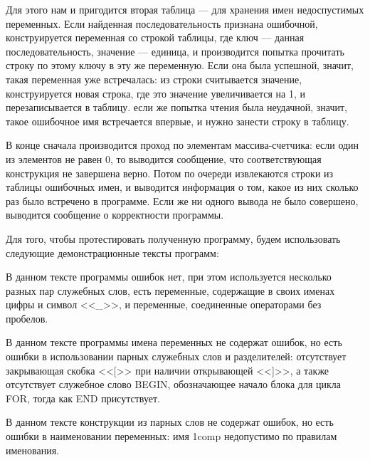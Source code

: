 \documentclass[12pt]{article}
\begin{document}
{	Для этого нам и пригодится вторая таблица --- для хранения имен недоспустимых переменных. Если найденная последовательность признана ошибочной, конструируется переменная со строкой таблицы, где ключ --- данная последовательность, значение --- единица, и производится попытка прочитать строку по этому ключу в эту же переменную. Если она была успешной, значит, такая переменная уже встречалась: из строки считывается значение, конструируется новая строка, где это значение увеличивается на 1, и перезаписывается в таблицу. если же попытка чтения была неудачной, значит, такое ошибочное имя встречается впервые, и нужно занести строку в таблицу.
	
	В конце сначала производится проход по элементам массива-счетчика: если один из элементов не равен 0, то выводится сообщение, что соответствующая конструкция не завершена верно. Потом по очереди извлекаются строки из таблицы ошибочных имен, и выводится информация о том, какое из них сколько раз было встречено в программе. Если же ни одного вывода не было совершено, выводится сообщение о корректности программы.
	
	 
	
	Для того, чтобы протестировать полученную программу, будем использовать следующие демонстрационные тексты программ:
	
	
	
	В данном тексте программы ошибок нет, при этом используется несколько разных пар служебных слов, есть переменные, содержащие в своих именах цифры и символ <<\_>>, и переменные, соединенные операторами без пробелов.
	
	
	
	В данном тексте программы имена переменных не содержат ошибок, но есть ошибки в использовании парных служебных слов и разделителей: отсутствует закрывающая скобка <<[>> при наличии открывающей <<]>>, а также отсутствует служебное слово BEGIN, обозначающее начало блока для цикла FOR, тогда как END присутствует. 
		
	
	
	В данном тексте конструкции из парных слов не содержат ошибок, но есть ошибки в наименовании переменных: имя 1comp недопустимо по правилам именования. 
		
	
	
}
\end{document}
